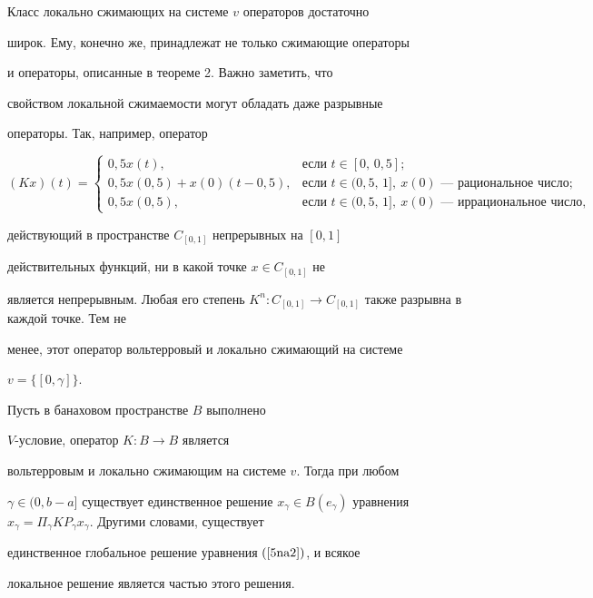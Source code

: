 Класс локально сжимающих на системе $v$ операторов достаточно


широк. Ему, конечно же, принадлежат не только сжимающие операторы


и операторы, описанные в теореме 2. Важно заметить, что


свойством локальной сжимаемости могут обладать даже разрывные


операторы. Так, например, оператор


$$


(Kx)(t)=


\begin{cases}


0{,}5 x(t),& \text{если } t\in [0,\,0{,}5];\\


0{,}5 x(0{,}5)+x(0)(t-0{,}5),& \text{если } t\in (0{,}5,\, 1], \


x(0) \text{ --- рациональное число};\\


0{,}5 x(0{,}5),& \text{если } t\in (0{,}5,\,1], \


x(0) \text{ --- иррациональное число},


\end{cases}


$$


действующий в пространстве $C_{[0,1]}$ непрерывных на $[0, 1]$


действительных функций, ни в какой точке $x\in C_{[0,1]}$ не


является непрерывным. Любая его степень $K^n :C_{[0,1]}


\to C_{[0,1]}$ также разрывна в каждой точке. Тем не


менее, этот оператор вольтерровый и локально сжимающий на системе


$v=\{[0, \gamma]\}$.








\begin{thm}


Пусть в банаховом пространстве $B$ выполнено


$V$-условие, оператор $K:B \to B$ является


вольтерровым и локально сжимающим на системе $v$. Тогда при любом


$\gamma\in (0, b-a]$ существует единственное решение $x_{\gamma}


\in B (e_{\gamma})$ уравнения $x_{\gamma}= \Pi_{\gamma}


K P_{\gamma} x_{\gamma}$. Другими словами, существует


единственное глобальное решение уравнения $(\ref{5na2})$, и всякое


локальное решение является частью этого решения.


\end{thm}









